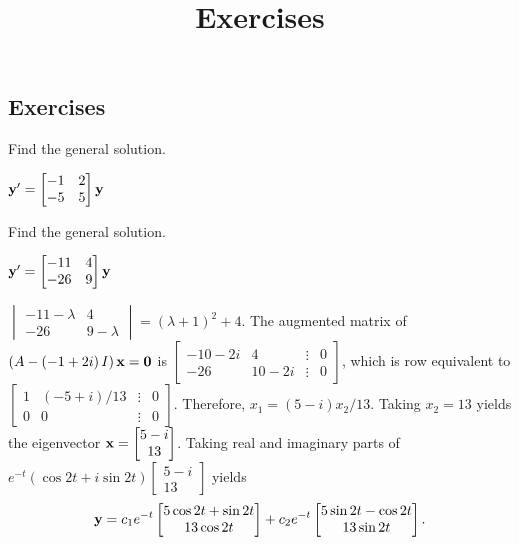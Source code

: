 \documentclass{ximera}
\title{Exercises} \license{CC BY-NC-SA 4.0}
\begin{document}
\begin{abstract}
\end{abstract}
\maketitle

\begin{onlineOnly}
\section*{Exercises}
\end{onlineOnly}


 \begin{problem}\label{exer:10.6.1}  
 Find the general solution.
 
 $ {\bf y}'= \begin{bmatrix}-1&2\\-5&5\end{bmatrix}{\bf y}$
\end{problem}

 \begin{problem}\label{exer:10.6.2}  
 Find the general solution.
 
 $ {\bf y}'= \begin{bmatrix}-11&4\\-26&9\end{bmatrix}{\bf y}$

 \begin{solution}
     $\begin{vmatrix}-11-\lambda&4\\-26&9-\lambda
\end{vmatrix}=(\lambda+1)^2+4$.
The augmented matrix of
$\left(A-\left(-1+2i\right)I\right){\bf x}={\bf 0}$ is
$ \begin{bmatrix}-10-2i&4&\vdots&0\\
-26&10-2i&\vdots&0  \end{bmatrix}$,
which is row equivalent to
$ \begin{bmatrix} 1&(-5+i)/13&\vdots&0\\
0&0&\vdots&0
 \end{bmatrix}$.
Therefore,    $x_1=(5-i)x_2/13$. Taking $x_2=13$ yields the eigenvector
${\bf x}= \begin{bmatrix}5-i\\13 \end{bmatrix}$.
Taking  real and imaginary parts of
$e^{-t}(\cos2t+i\sin2t)\begin{bmatrix}5-i\\13 \end{bmatrix}$ yields
$$
 {\bf y}= c_1e^{-t} \begin{bmatrix}5\cos2t+\sin2t\\13\cos2t \end{bmatrix}
+c_2e^{-t} \begin{bmatrix}5\sin2t-\cos2t\\13\sin2t \end{bmatrix}.
$$
 \end{solution}
\end{problem}
\end{document}
